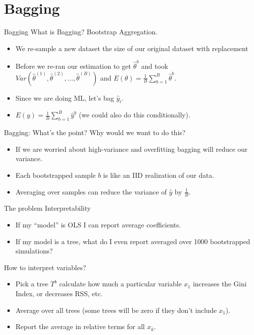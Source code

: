 \documentclass[xcolor=pdftex,dvipsnames,table,mathserif]{beamer}
\begin{document}
\section{Bagging}
\begin{frame}{Bagging}
What is \alert{Bagging}? \alert{B}ootstrap \alert{Agg}regation.
\begin{itemize}
\item We re-sample a new dataset the size of our original dataset \alert{with replacement}
\item Before we re-ran our estimation to get $\hat{\theta}^b$ and took $Var(\hat{\theta}^{(1)},\hat{\theta}^{(2)},\ldots,\hat{\theta}^{(B)})$ and $E(\theta)=\frac{1}{B} \sum_{b=1}^B \hat{\theta}^b$.
\item Since we are doing ML, let's bag $\hat{y}_i$.
\item $E(y )=\frac{1}{B} \sum_{b=1}^B \hat{y}^b$ (we could also do this conditionally).
\end{itemize}
\end{frame}

\begin{frame}{Bagging: What's the point?}
Why would we want to do this?
\begin{itemize}
\item If we are worried about high-variance and \alert{overfitting} bagging will reduce our variance.
\item Each bootstrapped sample $b$ is like an IID realization of our data.
\item Averaging over  samples can reduce the variance of $\hat{y}$ by $\frac{1}{B}$.
\end{itemize}
The problem \alert{Interpretability}
\begin{itemize}
\item If my ``model'' is OLS I can report average coefficients.
\item If my model is a tree, what do I even report averaged over 1000 bootstrapped simulations?
\end{itemize}
\end{frame}

\begin{frame}{How to interpret variables?}
\begin{itemize}
\item Pick a tree $T^b$ calculate how much a particular variable $x_1$ increases the Gini Index, or decreases RSS, etc.
\item Average over all trees (some trees will be zero if they don't include $x_1$).
\item Report the average in \alert{relative} terms for all $x_k$.
\end{itemize}

\end{frame}
\end{document}
